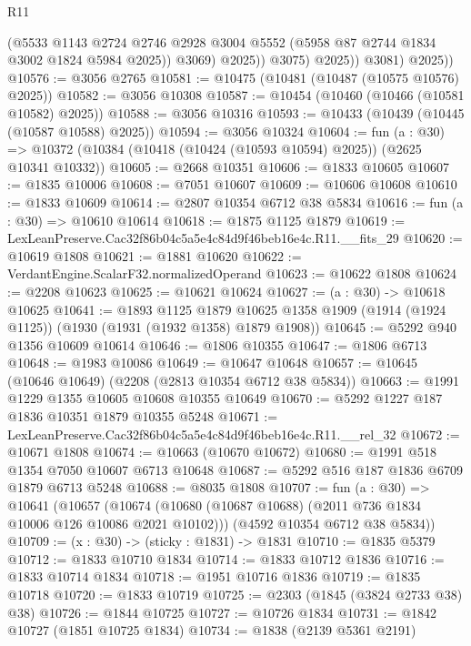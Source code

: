 \begin{lexlean}{R11}
\begin{coremodule}
                      (@5533
                        @1143
                        @2724
                        @2746
                        @2928
                        @3004
                        @5552
                        (@5958 @87 @2744 @1834 @3002 @1824 @5984 @2025))
                      @3069)
                    @2025))
                @3075)
              @2025))
          @3081)
        @2025))
@10576 := @3056 @2765
@10581 := @10475 (@10481 (@10487 (@10575 @10576) @2025))
@10582 := @3056 @10308
@10587 := @10454 (@10460 (@10466 (@10581 @10582) @2025))
@10588 := @3056 @10316
@10593 := @10433 (@10439 (@10445 (@10587 @10588) @2025))
@10594 := @3056 @10324
@10604 := fun (a : @30) =>
  @10372 (@10384 (@10418 (@10424 (@10593 @10594) @2025)) (@2625 @10341 @10332))
@10605 := @2668 @10351
@10606 := @1833 @10605
@10607 := @1835 @10006
@10608 := @7051 @10607
@10609 := @10606 @10608
@10610 := @1833 @10609
@10614 := @2807 @10354 @6712 @38 @5834
@10616 := fun (a : @30) => @10610 @10614
@10618 := @1875 @1125 @1879
@10619 := LexLeanPreserve.Cac32f86b04c5a5e4c84d9f46beb16e4c.R11.__fits_29
@10620 := @10619 @1808
@10621 := @1881 @10620
@10622 := VerdantEngine.ScalarF32.normalizedOperand
@10623 := @10622 @1808
@10624 := @2208 @10623
@10625 := @10621 @10624
@10627 := (a : @30) -> @10618 @10625
@10641 := @1893
    @1125
    @1879
    @10625
    @1358
    @1909
    (@1914 (@1924 @1125))
    (@1930 (@1931 (@1932 @1358) @1879 @1908))
@10645 := @5292 @940 @1356 @10609 @10614
@10646 := @1806 @10355
@10647 := @1806 @6713
@10648 := @1983 @10086
@10649 := @10647 @10648
@10657 := @10645 (@10646 @10649) (@2208 (@2813 @10354 @6712 @38 @5834))
@10663 := @1991 @1229 @1355 @10605 @10608 @10355 @10649
@10670 := @5292 @1227 @187 @1836 @10351 @1879 @10355 @5248
@10671 := LexLeanPreserve.Cac32f86b04c5a5e4c84d9f46beb16e4c.R11.__rel_32
@10672 := @10671 @1808
@10674 := @10663 (@10670 @10672)
@10680 := @1991 @518 @1354 @7050 @10607 @6713 @10648
@10687 := @5292 @516 @187 @1836 @6709 @1879 @6713 @5248
@10688 := @8035 @1808
@10707 := fun (a : @30) =>
  @10641
    (@10657
      (@10674 (@10680 (@10687 @10688) (@2011 @736 @1834 @10006 @126 @10086 @2021 @10102)))
      (@4592 @10354 @6712 @38 @5834))
@10709 := (x : @30) -> (sticky : @1831) -> @1831
@10710 := @1835 @5379
@10712 := @1833 @10710 @1834
@10714 := @1833 @10712 @1836
@10716 := @1833 @10714 @1834
@10718 := @1951 @10716 @1836
@10719 := @1835 @10718
@10720 := @1833 @10719
@10725 := @2303 (@1845 (@3824 @2733 @38) @38)
@10726 := @1844 @10725
@10727 := @10726 @1834
@10731 := @1842 @10727 (@1851 @10725 @1834)
@10734 := @1838 (@2139 @5361 @2191)

\end{coremodule}
\end{lexlean}
